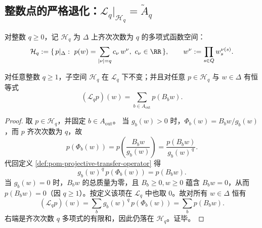 \subsection{整数点的严格退化：\texorpdfstring{$\mathcal{L}_q|_{\mathcal{H}_q}=\widetilde A_q$}{Lq|Hq=Aq}}
\begin{definition}[齐次多项式子空间]\label{def:pom-homogeneous-polynomials-simplex}
对整数 \(q\ge 0\)，记 \(\mathcal{H}_q\) 为 \(\Delta\) 上齐次次数为 \(q\) 的多项式函数空间：
\[
\mathcal{H}_q:=\{\,p|_{\Delta}:\ p(w)=\sum_{|\nu|=q}c_\nu\,w^\nu,\ c_\nu\in\RR\,\},
\qquad
w^\nu:=\prod_{s\in Q} w_s^{\nu(s)}.
\]
\end{definition}

\begin{proposition}[齐次子空间不变与分母消去]\label{prop:pom-projective-operator-invariant-homogeneous}
对任意整数 \(q\ge 1\)，子空间 \(\mathcal{H}_q\) 在 \(\mathcal{L}_q\) 下不变；并且对任意 \(p\in\mathcal{H}_q\) 与 \(w\in\Delta\) 有恒等式
\[
(\mathcal{L}_q p)(w)=\sum_{b\in A_{\mathrm{out}}} p(B_b w).
\]
\end{proposition}
\begin{proof}
取 \(p\in\mathcal{H}_q\)，并固定 \(b\in A_{\mathrm{out}}\)。
当 \(g_b(w)>0\) 时，\(\Phi_b(w)=B_b w/g_b(w)\)，而 \(p\) 齐次次数为 \(q\)，故
\[
p(\Phi_b(w))=p\!\left(\frac{B_b w}{g_b(w)}\right)=\frac{p(B_b w)}{g_b(w)^{\,q}}.
\]
代回定义 \ref{def:pom-projective-transfer-operator} 得
\[
g_b(w)^{\,q}\,p(\Phi_b(w))=p(B_b w).
\]
当 \(g_b(w)=0\) 时，\(B_b w\) 的总质量为零，且 \(B_b\ge 0,w\ge 0\) 蕴含 \(B_b w=0\)，从而 \(p(B_b w)=0\)（因 \(q\ge 1\)）。按定义该项在 \(\mathcal{L}_q\) 中也取 \(0\)。故对所有 \(w\in\Delta\) 恒有
\[
(\mathcal{L}_q p)(w)=\sum_{b} g_b(w)^{\,q}\,p(\Phi_b(w))=\sum_b p(B_b w).
\]
右端是齐次次数 \(q\) 多项式的有限和，因此仍落在 \(\mathcal{H}_q\)。证毕。
\end{proof}

